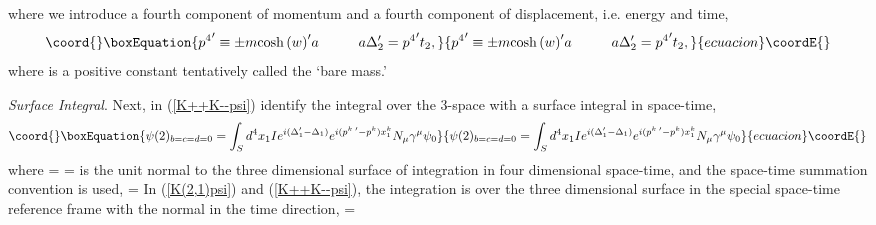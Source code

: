 \documentclass[a4paper,12pt]{article}
\begin{document}
where we introduce a fourth component of momentum and a fourth component of displacement, i.e. energy and time,
\begin{equation}\coord{}\boxEquation{	\label{p4t}
{p^{4}}^{\prime} \equiv \pm m {\cosh{(w)}}^{\prime} a   \hspace{1cm}  a \Delta_{2}^{\prime} = {p^{4}}^{\prime} t_{2} , 
}{	{p^{4}}^{\prime} \equiv \pm m {\cosh{(w)}}^{\prime} a   \hspace{1cm}  a \Delta_{2}^{\prime} = {p^{4}}^{\prime} t_{2} , 
}{ecuacion}\coordE{}\end{equation}
where \coordHE{} is a positive constant tentatively called the `bare mass.' 

	{\textit{Surface Integral}}. Next, in (\ref{K++K--psi}) identify the integral over the 3-space \coordHE{} with a surface integral in space-time,
\begin{equation}\coord{}\boxEquation{	\label{K++K--psi1}
\psi(2)_{b=c=d=0} = \int_{S} d^4 x_{1}I e^{ i (\Delta_{1}^{\prime}- \Delta_{1})} e^{i (p^{k \; \prime} - p^{k})x_{1}^{k}} N_{\mu} \gamma^{\mu} \psi_{0}
}{	\psi(2)_{b=c=d=0} = \int_{S} d^4 x_{1}I e^{ i (\Delta_{1}^{\prime}- \Delta_{1})} e^{i (p^{k \; \prime} - p^{k})x_{1}^{k}} N_{\mu} \gamma^{\mu} \psi_{0}
}{ecuacion}\coordE{}\end{equation}
where \coordHE{} = \coordHE{}  \myHighlight{$\mu \in$}\coordHE{}  \coordHE{}  \coordHE{} = \coordHE{} is the unit normal to the three dimensional surface of integration \coordHE{} in four dimensional space-time, and the space-time summation convention is used, \coordHE{} = \coordHE{} In (\ref{K(2,1)psi}) and (\ref{K++K--psi}), the integration is over the three dimensional surface \coordHE{} in the special space-time reference frame with the normal in the time direction,  \coordHE{} = \coordHE{} 
\end{document}

